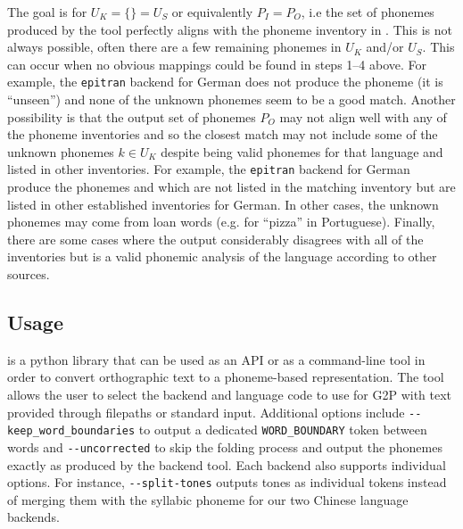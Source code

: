 The goal is for $U_K = \{\} = U_S$ or equivalently $P_I = P_O$, i.e the set of phonemes produced by the tool perfectly aligns with the phoneme inventory in \phoible. This is not always possible, often there are a few remaining phonemes in $U_K$ and/or $U_S$. This can occur when no obvious mappings could be found in steps 1--4 above. For example, the \texttt{epitran} backend for German does not produce the phoneme  (it is ``unseen'') and none of the unknown phonemes seem to be a good match. Another possibility is that the output set of phonemes $P_O$ may not align well with any of the \phoible phoneme inventories and so the closest match may not include some of the unknown phonemes $k \in U_K$ despite being valid phonemes for that language and listed in other inventories. For example, the \texttt{epitran} backend for German produce the phonemes  and  which are not listed in the matching inventory but are listed in other established inventories for German. In other cases, the unknown phonemes may come from loan words (e.g.  for ``pizza'' in Portuguese). Finally, there are some cases where the output considerably disagrees with all of the \phoible inventories but is a valid phonemic analysis of the language according to other sources.

\subsection{Usage}\label{sec:13-usage}

\gpp is a python library that can be used as an API or as a command-line tool in order to convert orthographic text to a phoneme-based representation. The tool allows the user to select the backend and language code to use for G2P with text provided through filepaths or standard input. Additional options include \verb|--keep_word_boundaries| to output a dedicated \texttt{WORD\_BOUNDARY} token between words and \verb|--uncorrected| to skip the folding process and output the phonemes exactly as produced by the backend tool. Each backend also supports individual options. For instance, \verb|--split-tones| outputs tones as individual tokens instead of merging them with the syllabic phoneme for our two Chinese language backends. 





